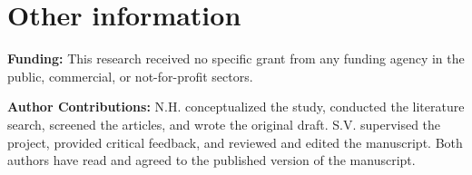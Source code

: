 \documentclass[twocolumn]{article}
\begin{document}
\section{Other information}

\textbf{Funding: }This research received no specific grant from any funding agency in the public, commercial, or not-for-profit sectors.

\textbf{Author Contributions: }N.H. conceptualized the study, conducted the literature search, screened the articles, and wrote the original draft. S.V. supervised the project, provided critical feedback, and reviewed and edited the manuscript. Both authors have read and agreed to the published version of the manuscript.



\nocite{*}

\end{document}
